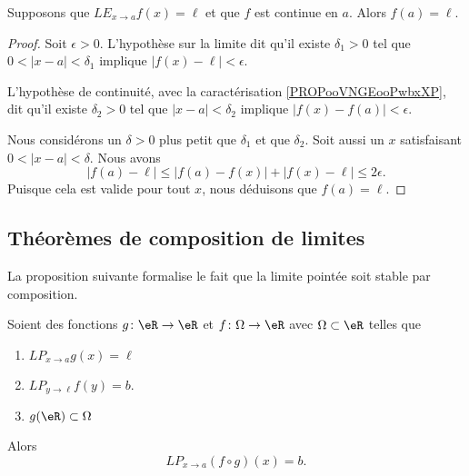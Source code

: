 \begin{lemma}     \label{LEMooNEGOooCllIMN}
	Supposons que \( {LE}_{x\to a}f(x)=\ell\) et que \( f\) est continue en \( a\). Alors \( f(a)=\ell\).
\end{lemma}

\begin{proof}
	Soit \( \epsilon>0\). L'hypothèse sur la limite dit qu'il existe \( \delta_1>0\) tel que \( 0<| x-a |<\delta_1\) implique \( | f(x)-\ell |<\epsilon\).

	L'hypothèse de continuité, avec la caractérisation \ref{PROPooVNGEooPwbxXP}, dit qu'il existe \( \delta_2>0\) tel que \( | x-a |<\delta_2\) implique \( | f(x)-f(a) |<\epsilon\).

	Nous considérons un \( \delta>0\) plus petit que \( \delta_1\) et que \( \delta_2\). Soit aussi un \( x\) satisfaisant \( 0<| x-a |<\delta\). Nous avons
	\begin{equation}
		| f(a)-\ell |\leq| f(a)-f(x) |+| f(x)-\ell |\leq 2\epsilon.
	\end{equation}
	Puisque cela est valide pour tout \( x\), nous déduisons que \( f(a)=\ell\).
\end{proof}

\subsection{Théorèmes de composition de limites}

La proposition suivante formalise le fait que la limite pointée soit stable par composition.
\begin{theorem}     \label{THOooOYXDooKDPkuW}
	Soient des fonctions \( g\colon \eR\to \eR\) et \( f\colon \Omega\to \eR\) avec \( \Omega\subset \eR\) telles que
	\begin{enumerate}
		\item
		      \( {LP}_{x\to a}g(x)=\ell\)
		\item
		      \( {LP}_{y\to \ell}f(y)=b\).
		\item
		      \( g(\eR)\subset \Omega\)
	\end{enumerate}
	Alors
	\begin{equation}
		{LP}_{x\to a} (f\circ g)(x)=b.
	\end{equation}
\end{theorem}

